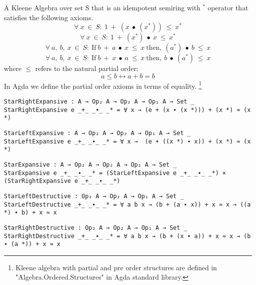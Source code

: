 A Kleene Algebra over set S that is an idempotent semiring with $^{*}$
operator that satisfies the following axioms.
\begin{equation}\label{eq_starrightexpansive}
\forall\ x\ \in\ S:\ 1\ +\ (x\ ∙\ (x^{*}))\ \leq\ x^{*}
\end{equation}
\begin{equation}\label{eq_starleftexpansive}
\forall\ x\ \in\ S:\ 1\ +\ (x^{*})\ ∙\ x\ \leq\ x^{*}
\end{equation}
\begin{equation}\label{eq_starleftdestructive}
\forall\ a,\ b,\ x\ \in\ S:\ \text{If} \ b\ +\ a\  ∙\ x\ \leq\ x\ \text{then},\ (a^{*})\ ∙\ b\ \leq\ x
\end{equation}
\begin{equation}\label{eq_starrightdestructive}
\forall\ a,\ b,\ x\ \in\ S:\ \text{If} \ b\ +\ x\ ∙\ a\ \leq\ x \  \text{then},\ b\ ∙\ (a^{*})\ \leq\ x
\end{equation}
where $\leq$ refers to the natural partial order: 
\[a \leq b \leftrightarrow a + b = b\] In Agda we define the partial order
axioms in terms of equality. \footnote{Kleene algebra with partial and pre order
structures are defined in "Algebra.Ordered.Structures" in Agda standard
library.}
\begin{verbatim}
StarRightExpansive : A → Op₂ A → Op₂ A → Op₁ A → Set _
StarRightExpansive e _+_ _∙_ _* = ∀ x → (e + (x ∙ (x *))) + (x *) ≈ (x *)
\end{verbatim}
\begin{verbatim}
StarLeftExpansive : A → Op₂ A → Op₂ A → Op₁ A → Set _
StarLeftExpansive e _+_ _∙_ _* = ∀ x →  (e + ((x *) ∙ x)) + (x *) ≈ (x *)
\end{verbatim}
\begin{verbatim}
StarExpansive : A → Op₂ A → Op₂ A → Op₁ A → Set _
StarExpansive e _+_ _∙_ _* = (StarLeftExpansive e _+_ _∙_ _*) × (StarRightExpansive e _+_ _∙_ _*)
\end{verbatim}
\begin{verbatim}
StarLeftDestructive : Op₂ A → Op₂ A → Op₁ A → Set _
StarLeftDestructive _+_ _∙_ _* = ∀ a b x → (b + (a ∙ x)) + x ≈ x → ((a *) ∙ b) + x ≈ x
\end{verbatim}
\begin{verbatim}
StarRightDestructive : Op₂ A → Op₂ A → Op₁ A → Set _
StarRightDestructive _+_ _∙_ _* = ∀ a b x → (b + (x ∙ a)) + x ≈ x → (b ∙ (a *)) + x ≈ x
\end{verbatim}
